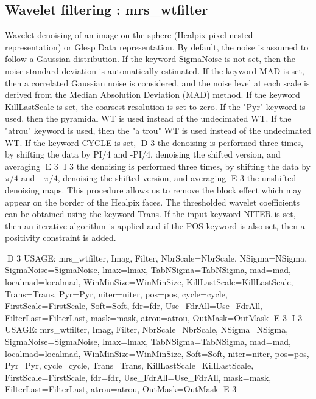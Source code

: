 \subsection{Wavelet filtering : mrs\_wtfilter}
Wavelet denoising of an image on the sphere (Healpix pixel nested representation) or Glesp Data representation. By default, 
the noise is assumed to follow a Gaussian distribution. If the keyword SigmaNoise is not set, then the noise standard deviation 
is automatically estimated. If the keyword MAD is set, then a correlated Gaussian noise is considered, and the noise level at 
each scale is derived from the Median Absolution Deviation (MAD) method. If the keyword KillLastScale is set, the coarsest 
resolution is set to zero. If the "Pyr" keyword is used, then the pyramidal WT is used instead of the undecimated WT. 
If the "atrou" keyword is used, then the "a trou" WT is used instead of the undecimated WT. If the keyword CYCLE is set, 
D 3
the denoising is performed three times, by shifting the data by PI/4 and -PI/4, denoising the shifted version, and averaging 
E 3
I 3
the denoising is performed three times, by shifting the data by $\pi/4$ and $-\pi/4$, denoising the shifted version, and averaging 
E 3
the unshifted denoising maps. This procedure allows us to remove the block effect which may appear on the border of the Healpix faces. 
The thresholded wavelet coefficients can be obtained using the keyword Trans. If the input keyword NITER is set, then an iterative 
algorithm is applied and if the POS keyword is also set, then a positivity constraint is added.
{\bf
\begin{center}
D 3
     USAGE:  mrs\_wtfilter, Imag, Filter, NbrScale=NbrScale, NSigma=NSigma, SigmaNoise=SigmaNoise, lmax=lmax, TabNSigma=TabNSigma, mad=mad, 
     localmad=localmad, WinMinSize=WinMinSize, KillLastScale=KillLastScale, Trans=Trans, Pyr=Pyr, niter=niter, pos=pos, cycle=cycle, 
     FirstScale=FirstScale, Soft=Soft, fdr=fdr, Use\_FdrAll=Use\_FdrAll, FilterLast=FilterLast, mask=mask, atrou=atrou, OutMask=OutMask 
E 3
I 3
     USAGE: mrs\_wtfilter, Imag, Filter, NbrScale=NbrScale, NSigma=NSigma, SigmaNoise=SigmaNoise, lmax=lmax, TabNSigma=TabNSigma, mad=mad, 
     localmad=localmad, WinMinSize=WinMinSize, Soft=Soft, niter=niter, pos=pos, Pyr=Pyr, cycle=cycle, Trans=Trans, KillLastScale=KillLastScale, 
     FirstScale=FirstScale, fdr=fdr, Use\_FdrAll=Use\_FdrAll, mask=mask, FilterLast=FilterLast, atrou=atrou, OutMask=OutMask 
E 3
\end{center}}
